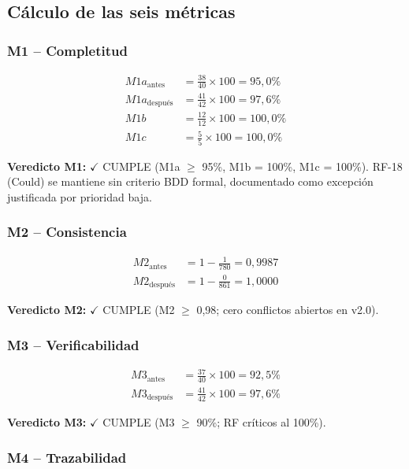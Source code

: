 \documentclass[11pt,a4paper]{article}
\begin{document}
\subsection{Cálculo de las seis métricas}

\subsubsection{M1 -- Completitud}

\begin{align*}
M1a_{\text{antes}} &= \frac{38}{40} \times 100 = 95{,}0\% \\
M1a_{\text{después}} &= \frac{41}{42} \times 100 = 97{,}6\% \\
M1b &= \frac{12}{12} \times 100 = 100{,}0\% \\
M1c &= \frac{5}{5} \times 100 = 100{,}0\%
\end{align*}

\textbf{Veredicto M1:} $\checkmark$ CUMPLE (M1a $\geq$ 95\%, M1b = 100\%, M1c = 100\%). RF-18 (Could) se mantiene sin criterio BDD formal, documentado como excepción justificada por prioridad baja.

\subsubsection{M2 -- Consistencia}

\begin{align*}
M2_{\text{antes}} &= 1 - \frac{1}{780} = 0{,}9987 \\
M2_{\text{después}} &= 1 - \frac{0}{861} = 1{,}0000
\end{align*}

\textbf{Veredicto M2:} $\checkmark$ CUMPLE (M2 $\geq$ 0,98; cero conflictos abiertos en v2.0).

\subsubsection{M3 -- Verificabilidad}

\begin{align*}
M3_{\text{antes}} &= \frac{37}{40} \times 100 = 92{,}5\% \\
M3_{\text{después}} &= \frac{41}{42} \times 100 = 97{,}6\%
\end{align*}

\textbf{Veredicto M3:} $\checkmark$ CUMPLE (M3 $\geq$ 90\%; RF críticos al 100\%).

\subsubsection{M4 -- Trazabilidad}
\end{document}
